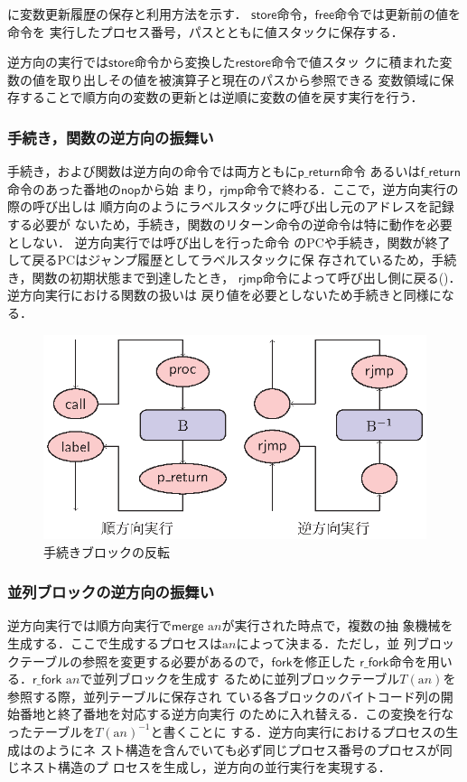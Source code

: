 \documentclass[submit,PRO]{ipsj}
\newcommand{\bcode}[1]{$\mathsf{#1}$}
\newcommand{\alabel}[1]{\mathrm{a}#1}
\begin{document}
に変数更新履歴の保存と利用方法を示す．
\bcode{store}命令，\bcode{free}命令では更新前の値を命令を
実行したプロセス番号，パスとともに値スタックに保存する．

逆方向の実行では\bcode{store}命令から変換した\bcode{restore}命令で値スタッ
クに積まれた変数の値を取り出しその値を被演算子と現在のパスから参照できる
変数領域に保存することで順方向の変数の更新とは逆順に変数の値を戻す実行を行う．

\subsubsection{手続き，関数の逆方向の振舞い}

手続き，および関数は逆方向の命令では両方ともに\bcode{p\_return}命令
あるいは\bcode{f\_return}命令のあった番地の\bcode{nop}から始
まり，\bcode{rjmp}命令で終わる．ここで，逆方向実行の際の呼び出しは
順方向のようにラベルスタックに呼び出し元のアドレスを記録する必要が
ないため，手続き，関数のリターン命令の逆命令は特に動作を必要としない．
逆方向実行では呼び出しを行った命令
のPCや手続き，関数が終了して戻るPCはジャンプ履歴としてラベルスタックに保
存されているため，手続き，関数の初期状態まで到達したとき，
\bcode{rjmp}命令によって呼び出し側に戻る()．逆方向実行における関数の扱いは
戻り値を必要としないため手続きと同様になる．

\begin{figure}[tb]
\begin{center}
\includegraphics[width=.75\linewidth]{./proc-flow.eps}
\end{center}
\caption{手続きブロックの反転}
\label{fig:procFlow}
\end{figure}

\subsubsection{並列ブロックの逆方向の振舞い}

逆方向実行では順方向実行で\bcode{merge} $\alabel{n}$が実行された時点で，複数の抽
象機械を生成する．ここで生成するプロセスは$\alabel{n}$によって決まる．ただし，並
列ブロックテーブルの参照を変更する必要があるので，\bcode{fork}を修正した
\bcode{r\_fork}命令を用いる．\bcode{r\_fork} $\alabel{n}$で並列ブロックを生成す
るために並列ブロックテーブル$T(\alabel{n})$を参照する際，並列テーブルに保存され
ている各ブロックのバイトコード列の開始番地と終了番地を対応する逆方向実行
のために入れ替える．この変換を行なったテーブルを$T(\alabel{n})^{-1}$と書くことに
する．逆方向実行におけるプロセスの生成はのようにネ
スト構造を含んでいても必ず同じプロセス番号のプロセスが同じネスト構造のプ
ロセスを生成し，逆方向の並行実行を実現する．
\end{document}
